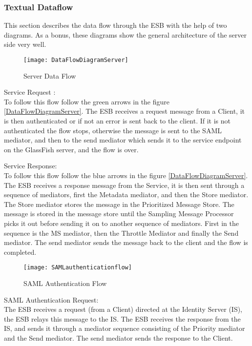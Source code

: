     \subsubsection{Textual Dataflow}\label{Textual Server Dataflow} 
        This section describes the data flow through the ESB with the help of two diagrams. As a bonus, these diagrams show the general architecture of the server side very well.

        \begin{figure}[h]
            \centering
            \texttt{[image: DataFlowDiagramServer]}
            \caption{Server Data Flow}
            \label{fig:DataFlowDiagramServer}
        \end{figure}

Service Request :\\
To follow this flow follow the green arrows in the figure \ref{DataFlowDiagramServer}. The ESB receives a request message from a Client, it is then authenticated or if not an error is sent back to the client. If it is not authenticated the flow stops, otherwise the message is sent to the SAML mediator, and then to the send mediator which sends it to the service endpoint on the GlassFish server, and the flow is over.

Service Response:\\
To follow this flow follow the blue arrows in the figure \ref{DataFlowDiagramServer}. The ESB receives a response message from the Service, it is then sent through a sequence of mediators, first the Metadata mediator, and then  the Store mediator. The Store mediator stores the message in the Prioritized Message Store. The message is stored in the message store until the Sampling Message Processor picks it out before sending it on to another sequence of mediators. First in the sequence is the MS mediator, then the Throttle Mediator and finally the Send mediator. The send mediator sends the message back to the client and the flow is completed.

    \begin{figure}[h]
        \centering
        \texttt{[image: SAMLauthenticationflow]}
        \caption{SAML Authentication Flow}
        \label{fig:SAMLauthenticationflow}
    \end{figure}
            
SAML Authentication Request:\\
The ESB receives a request (from a Client) directed at the Identity Server (IS), the ESB relays this message to the IS. The ESB receives the response from the IS, and sends it through a mediator sequence consisting of the Priority mediator and the Send mediator. The send mediator sends the response to the Client.

